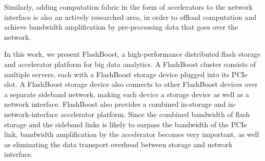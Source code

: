 Similarly, adding computation fabric in the form of accelerators to the network
interface is also an actively researched area, in order to offload computation
and achieve bandwidth amplification by pre-processing data that goes over the
network.

In this work, we present FlashBoost, a high-performance
distributed flash storage and accelerator platform for big data analytics.
A FlashBoost cluster consists of multiple servers, each with a FlashBoost
storage device plugged into its PCIe slot. A FlashBoost storage device also
connects to other FlashBoost devices over a separate sideband network, making
each device a storage device as well as a network interface.
FlashBoost also provides a combined in-storage and in-network-interface
accelerator platform. Since the combined bandwidth of flash storage and the
sideband links is likely to surpass the bandwidth of the PCIe link, bandwidth
amplification by the accelerator becomes very important, as well as eliminating
the data transport overhead between storage and network interface. 



\begin{comment}
FlashBoost aims to achieve the following goals:
\begin{enumerate}
\item \textbf{High Performance}: Software should be able to access
data in the entire cluster of flash storage with with low latency and high bandwidth.
\item \textbf{Effective Hardware Acceleration}: It should provide a platform for
building hardware accelerators with very low latency access to storage and
network, in order to improve computation performance and to make maximum use of
flash and network performance.
\item \textbf{Ease of Accelerator Development}: It should provide easy-to-use
interface into system components, allowing other developers to easily
build their own hardware accelerators.
\item \textbf{Sandbox for Software Stack Development}: Provide an easy-to use
software interface into flash storage and in-storage processor access, so that the software stack
can be optimized to the specific application.
\end{enumerate}
\end{comment}

